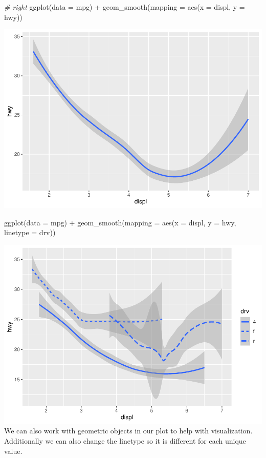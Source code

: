 \documentclass[
]{article}
\newenvironment{Shaded}{\begin{snugshade}}{\end{snugshade}}
\newcommand{\AttributeTok}[1]{\textcolor[rgb]{0.77,0.63,0.00}{#1}}
\newcommand{\CommentTok}[1]{\textcolor[rgb]{0.56,0.35,0.01}{\textit{#1}}}
\newcommand{\FunctionTok}[1]{\textcolor[rgb]{0.00,0.00,0.00}{#1}}
\newcommand{\NormalTok}[1]{#1}
\newcommand{\SpecialCharTok}[1]{\textcolor[rgb]{0.00,0.00,0.00}{#1}}
\begin{document}
\begin{Shaded}
\begin{Highlighting}[]
\CommentTok{\# right}
\FunctionTok{ggplot}\NormalTok{(}\AttributeTok{data =}\NormalTok{ mpg) }\SpecialCharTok{+} 
  \FunctionTok{geom\_smooth}\NormalTok{(}\AttributeTok{mapping =} \FunctionTok{aes}\NormalTok{(}\AttributeTok{x =}\NormalTok{ displ, }\AttributeTok{y =}\NormalTok{ hwy))}
\end{Highlighting}
\end{Shaded}

\includegraphics{Journal_files/figure-latex/unnamed-chunk-47-2.pdf}

\begin{Shaded}
\begin{Highlighting}[]
\FunctionTok{ggplot}\NormalTok{(}\AttributeTok{data =}\NormalTok{ mpg) }\SpecialCharTok{+} 
  \FunctionTok{geom\_smooth}\NormalTok{(}\AttributeTok{mapping =} \FunctionTok{aes}\NormalTok{(}\AttributeTok{x =}\NormalTok{ displ, }\AttributeTok{y =}\NormalTok{ hwy, }\AttributeTok{linetype =}\NormalTok{ drv))}
\end{Highlighting}
\end{Shaded}

\includegraphics{Journal_files/figure-latex/unnamed-chunk-47-3.pdf} We
can also work with geometric objects in our plot to help with
visualization. Additionally we can also change the linetype so it is
different for each unique value.
\end{document}
